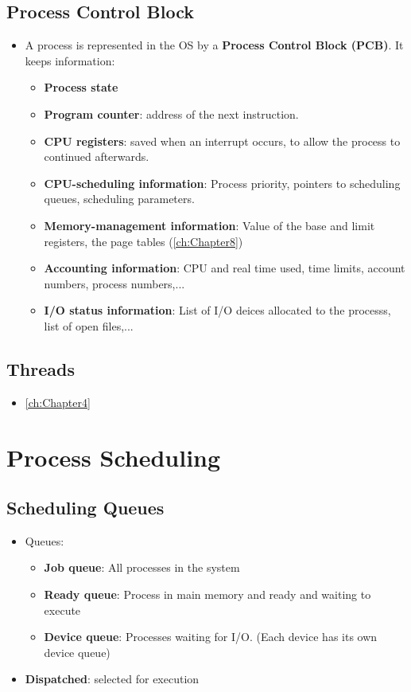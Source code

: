 \documentclass[10pt]{report}
\begin{document}
		\subsection{Process Control Block}
			\begin{itemize}
				\item A process is represented in the OS by a \textbf{Process Control Block (PCB)}. It keeps information:
				\begin{itemize}
					\item \textbf{Process state}
					\item \textbf{Program counter}: address of the next instruction.
					\item \textbf{CPU registers}: saved when an interrupt occurs, to allow the process to continued afterwards.
					\item \textbf{CPU-scheduling information}: Process priority, pointers to scheduling queues, scheduling parameters.
					\item \textbf{Memory-management information}: Value of the base and limit registers, the page tables (\autoref{ch:Chapter8})
					\item \textbf{Accounting information}: CPU and real time used, time limits, account numbers, process numbers,...
					\item \textbf{I/O status information}: List of I/O deices allocated to the processs, list of open files,...
				\end{itemize}
			\end{itemize}

		\subsection{Threads}
			\begin{itemize}
				\item \autoref{ch:Chapter4}
			\end{itemize}

	\section{Process Scheduling}
		\subsection{Scheduling Queues}
			\begin{itemize}
				\item Queues:
				\begin{itemize}
					\item \textbf{Job queue}: All processes in the system
					\item \textbf{Ready queue}: Process in main memory and ready and waiting to execute
					\item \textbf{Device queue}: Processes waiting for I/O. (Each device has its own device queue)
				\end{itemize}
				\item \textbf{Dispatched}: selected for execution
			\end{itemize}
\end{document}
